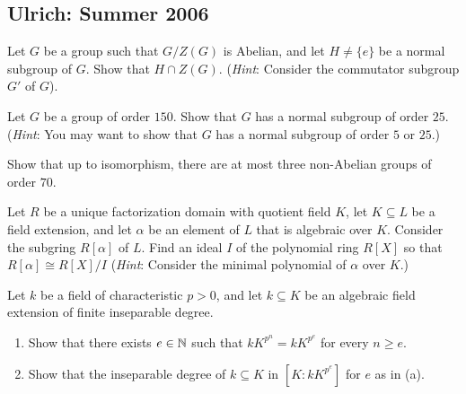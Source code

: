 \subsection{Ulrich: Summer 2006}
\setcounter{exercise}{0}
\setcounter{equation}{0}

\begin{problem}
  Let \(G\) be a group such that \(G/Z(G)\) is Abelian, and let
  \(H\neq\{e\}\) be a normal subgroup of \(G\). Show that \(H\cap
  Z(G)\). (\emph{Hint}: Consider  the commutator subgroup \(G'\) of
  \(G\)).
\end{problem}
\begin{solution}
\end{solution}

\begin{problem}
  Let \(G\) be a group of order \(150\). Show that \(G\) has a normal
  subgroup of order \(25\). (\emph{Hint}: You may want to show that \(G\)
  has a normal subgroup of order \(5\) or \(25\).)
\end{problem}
\begin{solution}
\end{solution}

\begin{problem}
  Show that up to isomorphism, there are at most three non-Abelian groups
  of order \(70\).
\end{problem}
\begin{solution}
\end{solution}

\begin{problem}
  Let \(R\) be a unique factorization domain with quotient field \(K\), let
  \(K\subseteq L\) be a field extension, and let \(\alpha\) be an element
  of \(L\) that is algebraic over \(K\). Consider the subgring
  \(R[\alpha]\) of \(L\). Find an ideal \(I\) of the polynomial ring
  \(R[X]\) so that \(R[\alpha]\cong R[X]/I\) (\emph{Hint}: Consider the
  minimal polynomial of \(\alpha\) over \(K\).)
\end{problem}
\begin{solution}
\end{solution}

\begin{problem}
  Let \(k\) be a field of characteristic \(p>0\), and let \(k\subseteq K\)
  be an algebraic field extension of finite inseparable degree.
  \begin{enumerate}[label=(\alph*),noitemsep]
  \item Show that there exists \(e\in\mathbb{N}\) such that \(kK^{p^n}=kK^{p^e}\)
    for every \(n\geq e\).
  \item Show that the inseparable degree of \(k\subseteq K\) in
    \([K:kK^{p^e}]\) for \(e\) as in (a).
  \end{enumerate}
\end{problem}
\begin{solution}
\end{solution}

